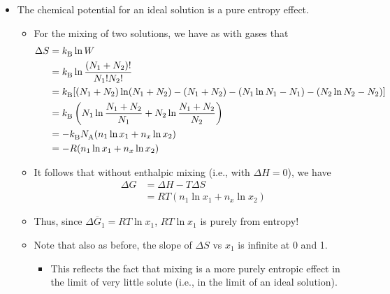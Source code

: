 \documentclass[../notes.tex]{subfiles}
\begin{document}
\begin{itemize}
\begin{itemize}
    \end{itemize}
    \item The chemical potential for an ideal solution is a pure entropy effect.
    \begin{itemize}
        \item For the mixing of two solutions, we have as with gases that
        \begin{align*}
            \Delta S &= {k_\text{B}^{}}\ln W\\
            &= {k_\text{B}^{}}\ln\frac{(N_1+N_2)!}{N_1!N_2!}\\
            &= {k_\text{B}^{}}[(N_1+N_2)\ln(N_1+N_2)-(N_1+N_2)-(N_1\ln N_1-N_1)-(N_2\ln N_2-N_2)]\\
            &= {k_\text{B}^{}}\left( N_1\ln\frac{N_1+N_2}{N_1}+N_2\ln\frac{N_1+N_2}{N_2} \right)\\
            &= -{k_\text{B}^{}}{N_\text{A}^{}}(n_1\ln x_1+n_x\ln x_2)\\
            &= -R(n_1\ln x_1+n_x\ln x_2)
        \end{align*}
        \item It follows that without enthalpic mixing (i.e., with $\Delta H=0$), we have
        \begin{align*}
            \Delta G &= \Delta H-T\Delta S\\
            &= RT(n_1\ln x_1+n_x\ln x_2)
        \end{align*}
        \item Thus, since $\Delta\overline{G}_1=RT\ln x_1$, $RT\ln x_1$ is purely from entropy!
        \item Note that also as before, the slope of $\Delta S$ vs $x_1$ is infinite at 0 and 1.
        \begin{itemize}
            \item This reflects the fact that mixing is a more purely entropic effect in the limit of very little solute (i.e., in the limit of an ideal solution).
        \end{itemize}
    \end{itemize}
\end{itemize}
\end{document}
